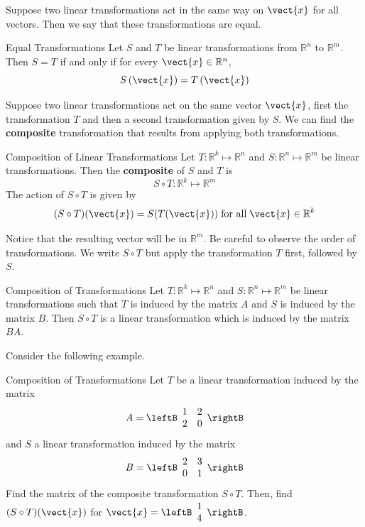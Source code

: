 Suppose two linear transformations act in the same way on $\vect{x}$ for all vectors. Then we say that these transformations are equal.

\begin{definition}{Equal Transformations}\label{def:equaltransformations}
Let $S$ and $T$ be linear transformations from $\mathbb{R}^n$ to $\mathbb{R}^m$. Then $S = T$ if and only if for every $\vect{x} \in \mathbb{R}^n$, 
\[
S \left( \vect{x} \right) = T \left( \vect{x} \right)
\]
\end{definition}

Suppose two linear transformations act on the same vector $\vect{x}$, first the transformation $T$ and then a second transformation given by $S$. We can find the \textbf{composite} transformation that results from applying both transformations.

\begin{definition}{Composition of Linear Transformations}\label{def:compositetransformations}
Let $T: \mathbb{R}^k \mapsto \mathbb{R}^n$ and $S: \mathbb{R}^n \mapsto \mathbb{R}^m$ be linear transformations. Then the  \textbf{composite} of $S$ and $T$ is 
\[
S \circ T: \mathbb{R}^k \mapsto \mathbb{R}^m
\]
The action of $S \circ T$ is given by 
\[
(S \circ T) (\vect{x}) = S(T(\vect{x})) \; \mbox{for all} \; \vect{x} \in \mathbb{R}^k
\]
\end{definition}

Notice that the resulting vector will be in $\mathbb{R}^m$. Be careful to observe the order of transformations. We write $S \circ T$ but apply the transformation $T$ first, followed by $S$. 

\begin{theorem}{Composition of Transformations}\label{thm:compositetransformation}
Let $T: \mathbb{R}^k \mapsto \mathbb{R}^n$ and $S: \mathbb{R}^n \mapsto \mathbb{R}^m$ be linear transformations such that $T$ is induced by the matrix $A$ and $S$ is induced by the matrix $B$. Then $S \circ T$ is a linear transformation which is induced by the matrix $BA$.
\end{theorem}

Consider the following example. 

\begin{example}{Composition of Transformations}\label{exa:compositetransformation}
Let $T$ be a linear transformation induced by the matrix 
\[
A = 
\leftB
\begin{array}{rr}
1 & 2 \\
2 & 0 
\end{array}
\rightB
\]
and $S$ a linear transformation induced by the matrix
\[
B = 
\leftB
\begin{array}{rr}
2 & 3 \\
0 & 1
\end{array}
\rightB
\]
Find the matrix of the composite transformation $S \circ T$. Then, find $(S \circ T)(\vect{x})$ for $\vect{x} = \leftB
\begin{array}{r}
1 \\
4 
\end{array}
\rightB$.
\end{example}

